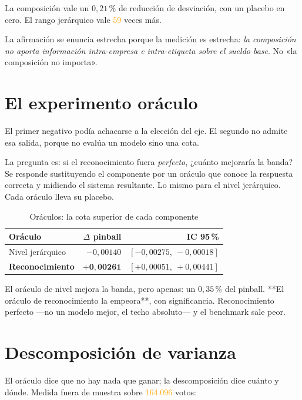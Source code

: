 \documentclass[12pt,a4paper,oneside]{report}
\newcommand{\verificar}[1]{\textcolor{orange}{#1}}
\begin{document}
La composición vale un $0{,}21\,\%$ de reducción de desviación, con un placebo en cero. El
rango jerárquico vale \verificar{59} veces más.

La afirmación se enuncia estrecha porque la medición es estrecha: \emph{la composición no
aporta información intra-empresa e intra-etiqueta sobre el sueldo base}. No «la composición
no importa».

\section{El experimento oráculo}

El primer negativo podía achacarse a la elección del eje. El segundo no admite esa salida,
porque no evalúa un modelo sino una cota.

La pregunta es: si el reconocimiento fuera \emph{perfecto}, ¿cuánto mejoraría la banda? Se
responde sustituyendo el componente por un oráculo que conoce la respuesta correcta y
midiendo el sistema resultante. Lo mismo para el nivel jerárquico. Cada oráculo lleva su
placebo.

\begin{table}[h]
\centering
\caption{Oráculos: la cota superior de cada componente}
\label{tab:oraculo}
\begin{tabular}{lrr}
\toprule
Oráculo & $\Delta$ pinball & IC 95\,\% \\
\midrule
Nivel jerárquico & $-0{,}00140$ & $[-0{,}00275,\ -0{,}00018]$ \\
\textbf{Reconocimiento} & $\mathbf{+0{,}00261}$ & $[+0{,}00051,\ +0{,}00441]$ \\
\bottomrule
\end{tabular}
\end{table}

El oráculo de nivel mejora la banda, pero apenas: un $0{,}35\,\%$ del pinball. **El oráculo
de reconocimiento la empeora**, con significancia. Reconocimiento perfecto ---no un modelo
mejor, el techo absoluto--- y el benchmark sale peor.

\section{Descomposición de varianza}

El oráculo dice que no hay nada que ganar; la descomposición dice cuánto y dónde. Medida
fuera de muestra sobre \verificar{164.096} votos:
\end{document}
